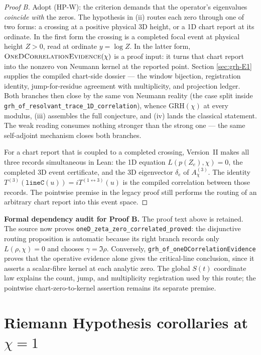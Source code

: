 \begin{proof}[Proof B]
Adopt (HP-W): the criterion demands that the operator's eigenvalues
\emph{coincide with} the zeros. The hypothesis in \textup{(ii)} routes each
zero through one of two forms: a crossing at a positive physical 3D height,
or a 1D chart
report at its ordinate.  In the first form the crossing is a completed focal
event at physical height \(Z>0\), read at ordinate \(y=\log Z\). In the latter
form, \(\textsc{OneDCorrelationEvidence}(\chi)\)
is a proof input: it turns that chart report into the nonzero von Neumann
kernel at the reported point. Section \ref{sec:grh-E1} supplies the compiled
chart-side dossier --- the window bijection, registration identity,
jump-for-residue agreement with multiplicity, and projection ledger. Both
branches then close by the same von Neumann reality (the case split inside
\texttt{grh\_of\_resolvant\_trace\_1D\_correlation}), whence
\(\mathrm{GRH}(\chi)\) at every modulus, \textup{(iii)} assembles the full
conjecture, and \textup{(iv)} lands the classical statement. The weak
reading consumes nothing stronger than the strong one --- the same
self-adjoint mechanism closes both branches.

For a chart report that is coupled to a completed crossing, Version~II makes
all three records simultaneous in Lean: the 1D equation
\(L(p(Z_e),\chi)=0\), the completed 3D event certificate, and the 3D
eigenvector \(\delta_e\) of \(A^{(3)}_\chi\).  The identity
\(T^{(3)}(\texttt{lineC}(u))=iT^{(1\leftrightarrow3)}(u)\) is the compiled
correlation between those records.  The pointwise premise in the legacy proof
still performs the routing of an arbitrary chart report into this event
space.
\end{proof}

\medskip
\noindent\textbf{Formal dependency audit for Proof B.}  The proof text above
is retained.  The source now proves
\texttt{oneD\_zeta\_zero\_correlated\_proved}: the disjunctive routing
proposition is automatic because its right branch records only
\(L(\rho,\chi)=0\) and chooses \(\gamma=\Im\rho\).  Conversely,
\texttt{grh\_of\_oneDCorrelationEvidence} proves that the operative evidence
alone gives the critical-line conclusion, since it asserts a scalar-fibre
kernel at each analytic zero.  The global \(S(t)\) coordinate law explains
the count, jump, and multiplicity registration used by this route; the
pointwise chart-zero-to-kernel assertion remains its separate premise.

\section{Riemann Hypothesis corollaries at \texorpdfstring{\(\chi=1\)}{chi=1}}
\label{sec:grh-rh}

